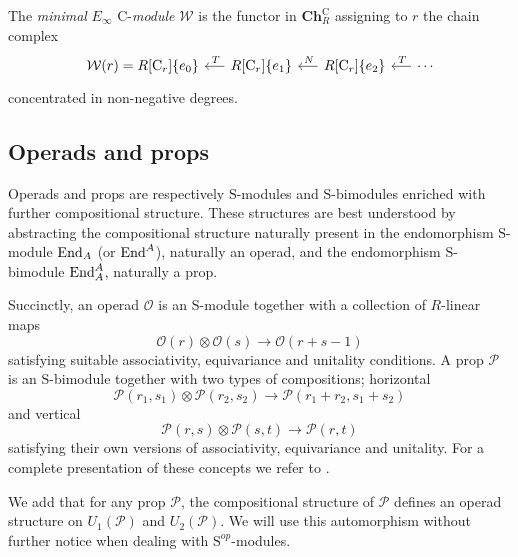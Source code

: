 \begin{definition} \label{def: minimal cyclic resolution}
	The \textit{minimal} $E_\infty$ $\mathrm{C}$-\textit{module} $\mathcal W$ is the functor in $\mathbf{Ch}_R^\mathrm{C}$ assigning to $r$ the chain complex
	\begin{equation*}
	\begin{tikzcd} [column sep = .5cm]
	\mathcal W(r) = R[\mathrm{C}_r]\{e_0\} & \arrow[l, "\,T"'] R[\mathrm{C}_r]\{e_1\} & \arrow[l, "\,N"'] R[\mathrm{C}_r]\{e_2\} & \arrow[l, "\,T"'] \cdots
	\end{tikzcd}
	\end{equation*}
	concentrated in non-negative degrees.
\end{definition}

\subsection{Operads and props}

Operads and props are respectively $\mathrm{S}$-modules and $\mathrm{S}$-bimodules enriched with further compositional structure.
These structures are best understood by abstracting the compositional structure naturally present in the endomorphism $\mathrm{S}$-module $\mathrm{End}_A$ (or $\mathrm{End}^A$), naturally an operad, and the endomorphism $\mathrm{S}$-bimodule $\mathrm{End}_A^A$, naturally a prop.

Succinctly, an operad $\mathcal O$ is an $\mathrm{S}$-module together with a collection of $R$-linear maps
\begin{equation*}
\mathcal O(r) \otimes \mathcal O(s) \to \mathcal O(r+s-1)
\end{equation*}
satisfying suitable associativity, equivariance and unitality conditions.
A prop $\mathcal P$ is an $\mathrm{S}$-bimodule together with two types of compositions; horizontal
\begin{equation*}
\mathcal P(r_1, s_1) \otimes \mathcal P(r_2, s_2) \to \mathcal P(r_1 + r_2, s_1 + s_2)
\end{equation*}
and vertical
\begin{equation*}
\mathcal P(r,s) \otimes \mathcal P(s, t) \to \mathcal P(r, t)
\end{equation*}
satisfying their own versions of associativity, equivariance and unitality.
For a complete presentation of these concepts we refer to \cite[Definitions 11 and 54]{markl2008props}.

We add that for any prop $\mathcal P$, the compositional structure of $\mathcal P$ defines an operad structure on $U_1(\mathcal P)$ and $U_2(\mathcal P)$.
We will use this automorphism without further notice when dealing with $\mathrm{S}^{op}$-modules.

